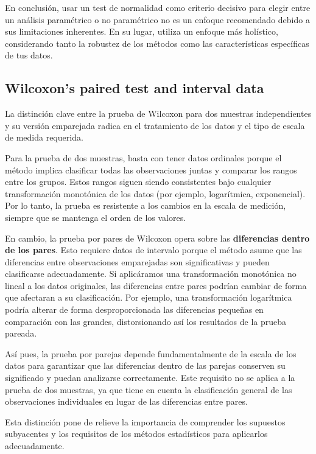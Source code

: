 \documentclass{config/apuntes}\usepackage[]{graphicx}\usepackage[]{xcolor}
\begin{document}
En conclusión, usar un test de normalidad como criterio decisivo para elegir entre un análisis paramétrico o no paramétrico no es un enfoque recomendado debido a sus limitaciones inherentes. En su lugar, utiliza un enfoque más holístico, considerando tanto la robustez de los métodos como las características específicas de tus datos.

\subsection{Wilcoxon's paired test and interval data}
La distinción clave entre la prueba de Wilcoxon para dos muestras independientes y su versión emparejada radica en el tratamiento de los datos y el tipo de escala de medida requerida.

Para la prueba de dos muestras, basta con tener datos ordinales porque el método implica clasificar todas las observaciones juntas y comparar los rangos entre los grupos. Estos rangos siguen siendo consistentes bajo cualquier transformación monotónica de los datos (por ejemplo, logarítmica, exponencial). Por lo tanto, la prueba es resistente a los cambios en la escala de medición, siempre que se mantenga el orden de los valores.

En cambio, la prueba por pares de Wilcoxon opera sobre las \textbf{diferencias dentro de los pares}. Esto requiere datos de intervalo porque el método asume que las diferencias entre observaciones emparejadas son significativas y pueden clasificarse adecuadamente. Si aplicáramos una transformación monotónica no lineal a los datos originales, las diferencias entre pares podrían cambiar de forma que afectaran a su clasificación. Por ejemplo, una transformación logarítmica podría alterar de forma desproporcionada las diferencias pequeñas en comparación con las grandes, distorsionando así los resultados de la prueba pareada.

Así pues, la prueba por parejas depende fundamentalmente de la escala de los datos para garantizar que las diferencias dentro de las parejas conserven su significado y puedan analizarse correctamente. Este requisito no se aplica a la prueba de dos muestras, ya que tiene en cuenta la clasificación general de las observaciones individuales en lugar de las diferencias entre pares.

Esta distinción pone de relieve la importancia de comprender los supuestos subyacentes y los requisitos de los métodos estadísticos para aplicarlos adecuadamente.
\end{document}
